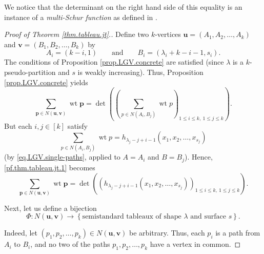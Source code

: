 \documentclass[reqno]{amsart}
\newcommand{\0}{\phantom{c}}
\let\sumnonlimits\sum
\renewcommand{\sum}{\sumnonlimits\limits}
\theoremstyle{plain}
\theoremstyle{definition}
\numberwithin{equation}{section}
\begin{document}
We notice that the determinant on the right hand side of this equality is an
instance of a \textit{multi-Schur function} as defined in \cite[(SCHUR.2.2)]%
{LLPT18}.

\begin{proof}
[Proof of Theorem \ref{thm.tableau.jt}.]Define two $k$-vertices $\mathbf{u}%
=\left(  A_{1},A_{2},\ldots,A_{k}\right)  $ and $\mathbf{v}=\left(
B_{1},B_{2},\ldots,B_{k}\right)  $ by%
\[
A_{i}=\left(  k-i,1\right)  \qquad\text{and}\qquad B_{i}=\left(  \lambda
_{i}+k-i-1,s_{i}\right)  .
\]
The conditions of Proposition \ref{prop.LGV.concrete} are satisfied (since
$\lambda$ is a $k$-pseudo-partition and $s$ is weakly increasing). Thus,
Proposition \ref{prop.LGV.concrete} yields%
\begin{equation}
\sum_{\mathbf{p}\in N\left(  \mathbf{u},\mathbf{v}\right)  }\operatorname*{wt}%
\mathbf{p}=\det\left(  \left(  \sum_{p\in N\left(  A_{i},B_{j}\right)
}\operatorname*{wt}p\right)  _{1\leq i\leq k,\ 1\leq j\leq k}\right)  .
\label{pf.thm.tableau.jt.1}%
\end{equation}
But each $i,j\in\left[  k\right]  $ satisfy%
\begin{equation}
\sum_{p\in N\left(  A_{i},B_{j}\right)  }\operatorname*{wt}p=h_{\lambda
_{j}-j+i-1}\left(  x_{1},x_{2},\ldots,x_{s_{j}}\right)
\label{pf.thm.tableau.jt.2}%
\end{equation}
(by \eqref{eq.LGV.single-paths}, applied to $A=A_{i}$ and $B=B_{j}$). Hence,
\eqref{pf.thm.tableau.jt.1} becomes%
\begin{equation}
\sum_{\mathbf{p}\in N\left(  \mathbf{u},\mathbf{v}\right)  }\operatorname*{wt}%
\mathbf{p}=\det\left(  \left(  h_{\lambda_{j}-j+i-1}\left(  x_{1},x_{2}%
,\ldots,x_{s_{j}}\right)  \right)  _{1\leq i\leq k,\ 1\leq j\leq k}\right)  .
\label{pf.thm.tableau.jt.3}%
\end{equation}


Next, let us define a bijection%
\[
\Phi:N\left(  \mathbf{u},\mathbf{v}\right)  \rightarrow\left\{
\text{semistandard tableaux of shape }\lambda\text{ and surface }s\right\}  .
\]


Indeed, let $\left(  p_{1},p_{2},\ldots,p_{k}\right)  \in N\left(
\mathbf{u},\mathbf{v}\right)  $ be arbitrary. Thus, each $p_{i}$ is a path
from $A_{i}$ to $B_{i}$, and no two of the paths $p_{1},p_{2},\ldots,p_{k}$
have a vertex in common.


\end{proof}
\end{document}
